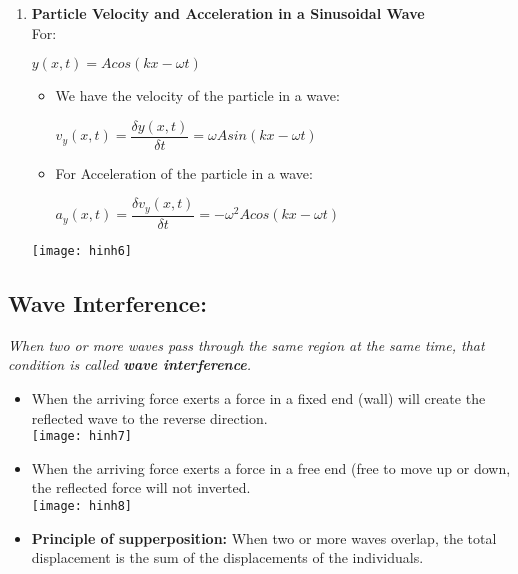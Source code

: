 \documentclass[10pt]{article}
\begin{document}
\begin{enumerate}
	\item \textbf{Particle Velocity and Acceleration in a Sinusoidal Wave} \\
	For: \\
	\begin{center}
		$y(x, t) = A cos(kx - \omega t)$
	\end{center}

	\begin{itemize}
		\item We have the velocity of the particle in a wave:
			\begin{center}
				$v_{y}(x, t) = \dfrac{\delta y(x, t)}{\delta t} =  \omega A sin(kx - \omega t)$
			\end{center}
		\item For Acceleration of the particle in a wave:
			\begin{center}
				$a_{y}(x, t) = \dfrac{\delta v_{y}(x, t)}{\delta t} = - \omega^{2} A cos(kx - \omega t)$
			\end{center}
	\end{itemize}

	\texttt{[image: hinh6]}
	\bigbreak
\end{enumerate}
\subsection{Wave Interference:}
\textit{When two or more waves pass through the same region at the same time, that condition is called \textbf{wave interference}.} \\

\begin{itemize}
	\item When the arriving force exerts a force in a fixed end (wall) will create the reflected wave to the reverse direction. \\
	\texttt{[image: hinh7]}
	\bigbreak
	\item When the arriving force exerts a force in a free end (free to move up or down, the reflected force will not inverted. \\
	\texttt{[image: hinh8]}
	\bigbreak
	\item \textbf{Principle of supperposition:} When two or more waves overlap, the total displacement is the sum of the displacements of the individuals.
\end{itemize}
\end{document}
